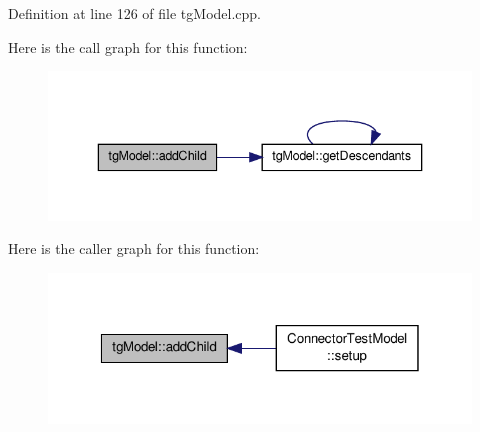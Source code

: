 Definition at line 126 of file tg\-Model.\-cpp.



Here is the call graph for this function\-:\nopagebreak
\begin{figure}[H]
\begin{center}
\leavevmode
\includegraphics[width=340pt]{classtg_model_a292c17848b96caee32b2286e44c13f2f_cgraph}
\end{center}
\end{figure}




Here is the caller graph for this function\-:\nopagebreak
\begin{figure}[H]
\begin{center}
\leavevmode
\includegraphics[width=320pt]{classtg_model_a292c17848b96caee32b2286e44c13f2f_icgraph}
\end{center}
\end{figure}


